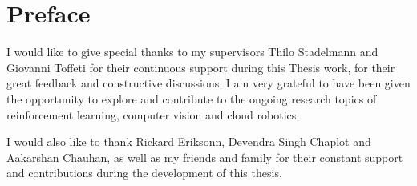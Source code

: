 \chapter*{Preface}
I would like to give special thanks to my supervisors Thilo Stadelmann and Giovanni Toffeti for their continuous support during this Thesis work, for their great feedback and constructive discussions. I am very grateful to have been given the opportunity to explore and contribute to the ongoing research topics of reinforcement learning, computer vision and cloud robotics.  

I would also like to thank Rickard Eriksonn, Devendra Singh Chaplot and Aakarshan Chauhan, as well as my friends and family for their constant support and contributions during the development of this thesis.


